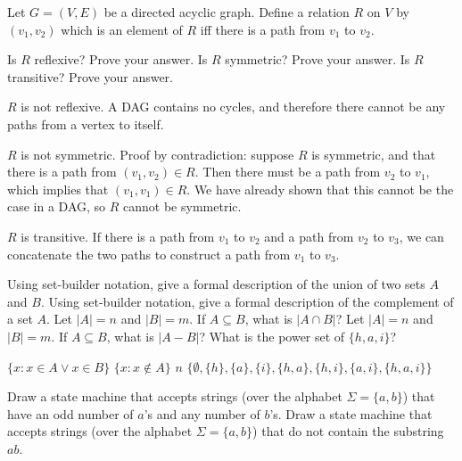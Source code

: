 \documentclass[solution, letterpaper]{cs20exam}
\begin{document}
\problem{}{}
Let $G = (V, E)$ be a directed acyclic graph. Define a relation $R$ on $V$ by $(v_1, v_2)$ which is an element of $R$ iff there is a path from $v_1$ to $v_2$.

\subproblem Is $R$ reflexive? Prove your answer.
\subproblem Is $R$ symmetric? Prove your answer.
\subproblem Is $R$ transitive? Prove your answer.

\begin{solution}

\subsolution $R$ is not reflexive. A DAG contains no cycles, and therefore there cannot be any paths from a vertex to itself.

\subsolution $R$ is not symmetric. Proof by contradiction: suppose $R$ is symmetric, and that there is a path from $(v_1, v_2) \in R$. Then there must be a path from $v_2$ to $v_1$, which implies that $(v_1, v_1) \in R$. We have already shown that this cannot be the case in a DAG, so $R$ cannot be symmetric.

\subsolution $R$ is transitive. If there is a path from $v_1$ to $v_2$ and a path from $v_2$ to $v_3$, we can concatenate the two paths to construct a path from $v_1$ to $v_3$.

\end{solution}


\pagebreak


\problem{}{}

\subproblem Using set-builder notation, give a formal description of the union of two sets $A$ and $B$. %
\subproblem Using set-builder notation, give a formal description of the complement of a set $A$. %
\subproblem Let $|A| = n$ and $|B| = m$. If $A \subseteq B$, what is $|A \cap B|$? %
\subproblem Let $|A| = n$ and $|B| = m$. If $A \subseteq B$, what is $|A - B|$? %
\subproblem What is the power set of $\{ h, a, i\}$? %

\begin{solution}
\subsolution $\{x : x \in A \vee x \in B\}$
\subsolution $\{x : x \notin A\}$
\subsolution $n$
\subsolution $\{\emptyset, \{h\}, \{a\}, \{i\}, \{h, a\}, \{h, i\}, \{a, i\}, \{h, a, i\} \}$
\end{solution}

\problem{}{} 
\subproblem Draw a state machine that accepts strings (over the alphabet $\Sigma = \{a, b\}$) that have an odd number of $a$'s and any number of $b$'s.
\subproblem Draw a state machine that accepts strings (over the alphabet $\Sigma = \{a, b\}$) that do not contain the substring $ab$.
\end{document}
